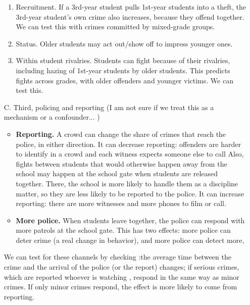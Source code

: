 \documentclass[11pt]{article}
\begin{document}
\begin{enumerate}
\begin{enumerate}
            \item Recruitment. If a 3rd-year
                  student pulls 1st-year students into a theft, the 3rd-year
                  student's own crime also increases, because they offend
                  together. We can test this with crimes committed by mixed-grade
                  groups.             
            \item Status. Older students may act out/show off to
                  impress younger ones. 
            \item Within student rivalries. Students can fight because of their
                  rivalries, including hazing of 1st-year students by older
                  students. This predicts fights
                 across grades, with older offenders and younger
                  victims. We can test this. 
      \end{enumerate}
            \item[C.] Third, policing and reporting (I am not sure if we treat this as a mechanism or a confounder... )

            \begin{itemize}
                  \item \textbf{Reporting.} A crowd can change the share of
                        crimes that reach the police, in either direction.
                        It can decrease reporting:                       offenders are harder to identify in a crowd and
                         each witness expects
                        someone else to call
                   Also, fights between students that would otherwise happen away from the school
may happen at the school gate when students are released together. There, the
school is more likely to handle them as a discipline matter, so they are less
likely to be reported to the police.
                         It can increase reporting: there are
                        more witnesses and more phones to film or call.
                  \item \textbf{More police.} When students leave together,
                        the police can respond with more patrols at the school
                        gate. This has two effects: more
                        police can deter crime (a real change in
                        behavior), and more police can detect more, 
            \end{itemize}
            We can test for these channels by checking :the average time between the crime and the arrival of
                        the police (or the report) changes; if serious crimes, which are reported whoever is watching
                       , respond in the same way as          minor crimes. If only minor crimes respond, the effect
                        is more likely to come from reporting.

\end{enumerate}
\end{document}
